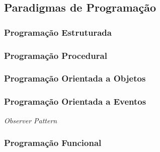 \subsection{Paradigmas de Programação}
\label{sec:prog_paradigms}

\subsubsection{Programação Estruturada}
\label{sec:prog_estruturada}

\subsubsection{Programação Procedural}
\label{sec:prog_procedural}

\subsubsection{Programação Orientada a Objetos}
\label{sec:oop}

\subsubsection{Programação Orientada a Eventos}
\label{sec:prog_orienta_a_eventos}

{\tiny\begin{description}[noitemsep]
  \item [Design Patterns] \emph{Observer Pattern}
  \item [\emph{Callbacks}]
\end{description}}

\subsubsection{Programação Funcional}
\label{sec:fp}


